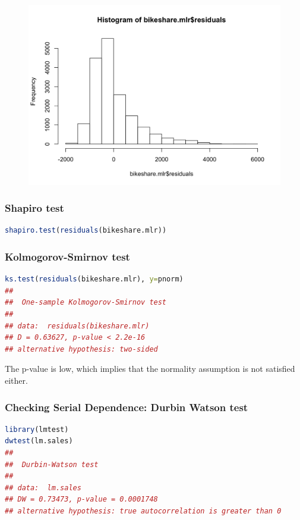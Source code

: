 \documentclass[11pt,a4paper]{article}
\begin{document}
\begin{center}\begin{figure}[htbp]
  \centering
  \includegraphics[scale=0.2]{d4.png}
  \caption{}
  \label{}
\end{figure}\end{center}

\subsubsection{Shapiro test}
\begin{lstlisting}[language=R]
shapiro.test(residuals(bikeshare.mlr))
\end{lstlisting}
\subsubsection{Kolmogorov-Smirnov test}
\begin{lstlisting}[language=R]
ks.test(residuals(bikeshare.mlr), y=pnorm)
## 
##  One-sample Kolmogorov-Smirnov test
## 
## data:  residuals(bikeshare.mlr)
## D = 0.63627, p-value < 2.2e-16
## alternative hypothesis: two-sided
\end{lstlisting}
The p-value is low, which implies that the normality assumption is not satisfied either.

\subsubsection{Checking Serial Dependence: Durbin Watson test}
\begin{lstlisting}[language=R]
library(lmtest)
dwtest(lm.sales)
##
##  Durbin-Watson test
##
## data:  lm.sales
## DW = 0.73473, p-value = 0.0001748
## alternative hypothesis: true autocorrelation is greater than 0
\end{lstlisting}
\end{document}
